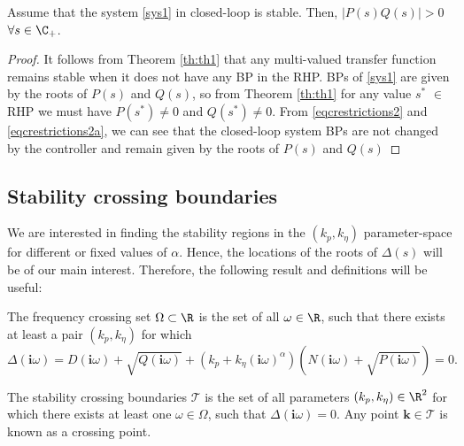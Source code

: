\documentclass[twoside,reqno,11pt]{fcaa-var} %
\begin{document}
\begin{proposition}\label{prop:PDrest2}
	Assume that the system \eqref{sys1} in closed-loop is stable. Then, $\left|P(s)Q(s)\right|>0$ $\forall s\in\C_{+}$.
\end{proposition}
\begin{proof}
	It follows from Theorem \ref{th:th1} that any multi-valued transfer function remains stable when it does not have any BP in the RHP. BPs of \eqref{sys1} are given by the roots of $P(s)$ and $Q(s)$, so from Theorem \ref{th:th1} for any value $s^*$ $\in$ RHP we must have $P(s^*)\neq 0$ and $Q(s^*)\neq 0$. From \eqref{eqcrestrictions2} and \eqref{eqcrestrictions2a}, we can see that the closed-loop system BPs are not changed by the controller and remain given by the roots of $P(s)$ and $Q(s)$
\end{proof}
\subsection{Stability crossing boundaries}
We are interested in finding the stability regions in the $(k_p,k_\eta)$ parameter-space for different or fixed values of $\alpha$. Hence, the locations of the roots of $\Delta(s)$ will be of our main interest. Therefore, the following result and definitions will be useful:
\begin{definition}\label{Def:Omega}
	The frequency crossing set $\Omega\subset\R$ is the set of all $\omega\in\R$, such that there exists at least a pair $(k_p,k_\eta)$ for which
	\begin{equation}
	\Delta(\bm{i}\omega)\!=\!D(\bm{i}\omega)\!+\!\sqrt{Q(\bm{i}\omega)}\!+\!(k_p\!+\!k_\eta(\bm{i}\omega)^\alpha)(N(\bm{i}\omega)\!+\!\sqrt{P(\bm{i}\omega)})\!=\!0.\label{eq:Omega}
	\end{equation}
\end{definition}
\begin{definition}
	The stability crossing boundaries $\mathcal{T}$ is the set of all parameters $(k_p,k_\eta)\in\R^2$ for which there exists at least one $\omega\in\Omega$, such that $\Delta(\bm{i}\omega)=0$. Any point $\bm{k}\in\mathcal{T}$ is known as a crossing point.
\end{definition}
\end{document}
